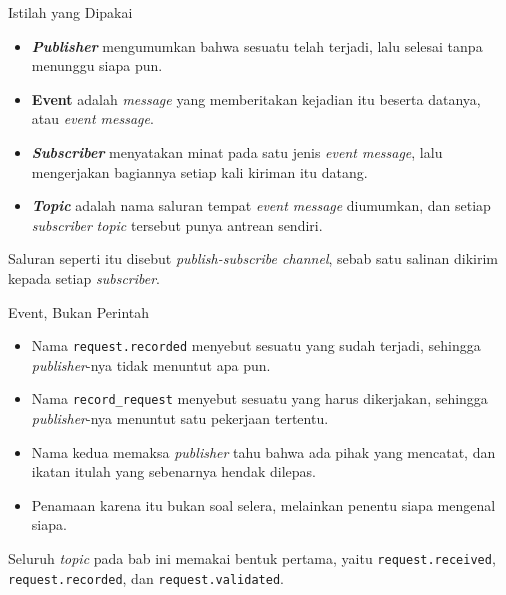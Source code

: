 \documentclass[aspectratio=169, table, 12pt]{beamer}
\begin{document}
\begin{frame}{{\Large Istilah yang Dipakai}}
  \vspace{10pt}
  \begin{itemize}\small
    \item \textbf{\textit{Publisher}} mengumumkan bahwa sesuatu telah terjadi, lalu
          selesai tanpa menunggu siapa pun.
    \item \textbf{Event} adalah \textit{message} yang memberitakan kejadian itu
          beserta datanya, atau \textit{event message}.
    \item \textbf{\textit{Subscriber}} menyatakan minat pada satu jenis \textit{event
          message}, lalu mengerjakan bagiannya setiap kali kiriman itu datang.
    \item \textbf{\textit{Topic}} adalah nama saluran tempat \textit{event message} diumumkan, dan setiap
          \textit{subscriber} \textit{topic} tersebut punya antrean sendiri.
  \end{itemize}

  \vspace{10pt}
  {\small Saluran seperti itu disebut \textit{publish-subscribe channel}, sebab
  satu salinan dikirim kepada setiap \textit{subscriber}.}
\end{frame}

\begin{frame}{{\Large Event, Bukan Perintah}}
  \vspace{10pt}
  \begin{itemize}\small
    \item Nama \texttt{request.recorded} menyebut sesuatu yang sudah terjadi,
          sehingga \textit{publisher}-nya tidak menuntut apa pun.
    \item Nama \texttt{record\_request} menyebut sesuatu yang harus
          dikerjakan, sehingga \textit{publisher}-nya menuntut satu pekerjaan tertentu.
    \item Nama kedua memaksa \textit{publisher} tahu bahwa ada pihak yang mencatat, dan
          ikatan itulah yang sebenarnya hendak dilepas.
    \item Penamaan karena itu bukan soal selera, melainkan penentu siapa
          mengenal siapa.
  \end{itemize}

  \vspace{10pt}
  {\small Seluruh \textit{topic} pada bab ini memakai bentuk pertama, yaitu
  \texttt{request.received}, \texttt{request.recorded}, dan
  \texttt{request.validated}.}
\end{frame}
\end{document}
